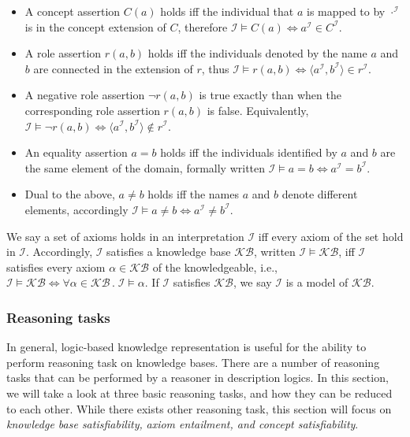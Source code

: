 \begin{itemize}
    \item A concept assertion $C(a)$ holds iff the individual that $a$ is mapped to by $\cdot^\mathcal{I}$ is in the concept extension of $C$, therefore $\mathcal{I} \vDash C (a) \iff a^\mathcal{I} \in C^\mathcal{I}$.
    \item A role assertion $r(a, b)$ holds iff the individuals denoted by the name $a$ and $b$ are connected in the extension of $r$, thus $\mathcal{I} \vDash r (a, b) \iff \langle a^\mathcal{I}, b^\mathcal{I} \rangle \in r^\mathcal{I}$.
    \item A negative role assertion $\lnot r (a, b)$ is true exactly than when the corresponding role assertion $r (a, b)$ is false. Equivalently,  $\mathcal{I} \vDash \lnot r (a, b) \iff \langle a^\mathcal{I}, b^\mathcal{I} \rangle \not\in r^\mathcal{I}$.
    \item An equality assertion $a = b$ holds iff the individuals identified by $a$ and $b$ are the same element of the domain, formally written $\mathcal{I} \vDash a = b \iff a^\mathcal{I} = b^\mathcal{I}$.
    \item Dual to the above, $a \not = b$ holds iff the names $a$ and $b$ denote different elements, accordingly $\mathcal{I} \vDash a \not= b \iff a^\mathcal{I} \not= b^\mathcal{I}$.
\end{itemize}

We say a set of axioms holds in an interpretation $\mathcal{I}$ iff every axiom of the set hold in $\mathcal{I}$. Accordingly, $\mathcal{I}$ satisfies a knowledge base $\mathcal{KB}$, written $\mathcal{I} \vDash \mathcal{KB}$, iff $\mathcal{I}$ satisfies every axiom $\alpha \in \mathcal{KB}$ of the knowledgeable, i.e., $\mathcal{I} \vDash \mathcal{KB} \iff \forall \alpha \in \mathcal{KB} \, . \; \mathcal{I} \vDash \alpha$. If $\mathcal{I}$ satisfies $\mathcal{KB}$, we say $\mathcal{I}$ is a model of $\mathcal{KB}$.

\subsubsection{Reasoning tasks} \label{reasoning-tasks}

In general, logic-based knowledge representation is useful for the ability to perform reasoning task on knowledge bases. There are a number of reasoning tasks that can be performed by a reasoner in description logics. In this section, we will take a look at three basic reasoning tasks, and how they can be reduced to each other. While there exists other reasoning task, this section will focus on \emph{knowledge base satisfiability,} \emph{axiom entailment, and concept satisfiability}.

